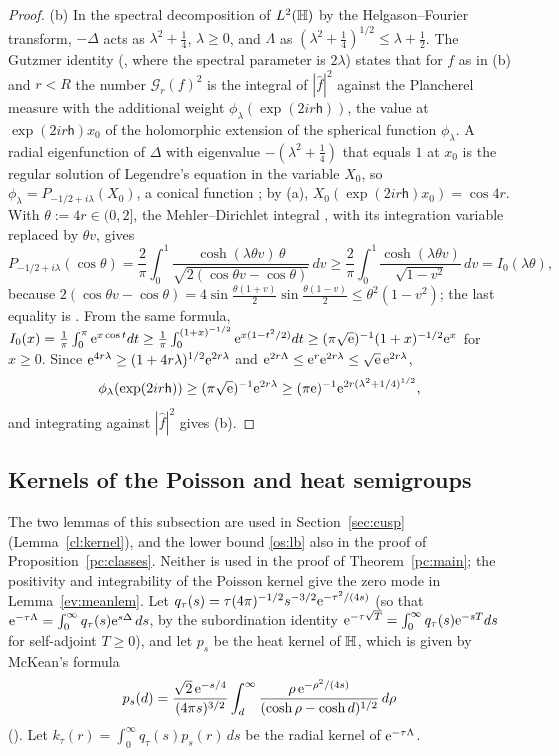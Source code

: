\begin{proof}
(b) In the spectral decomposition of $L^2(\mathbb{H})$ by the Helgason--Fourier transform, $-\Delta$ acts as $\lambda^2+\tfrac14$, $\lambda\ge0$, and
$\Lambda$ as $(\lambda^2+\tfrac14)^{1/2}\le\lambda+\tfrac12$. The Gutzmer identity (\cite[\S7.2, the identity before Theorem~7.2]{K}, where the
spectral parameter is $2\lambda$) states that for $f$ as in (b) and $r<R$ the number $\mathcal G_r(f)^2$ is the integral of $|\hat f|^2$ against the
Plancherel measure with the additional weight $\phi_\lambda(\exp(2ir\mathsf h))$, the value at $\exp(2ir\mathsf h)x_0$ of the holomorphic extension of the
spherical function $\phi_\lambda$. A radial eigenfunction of $\Delta$ with eigenvalue $-(\lambda^2+\tfrac14)$ that equals $1$ at $x_0$ is the regular
solution of Legendre's equation in the variable $X_0$, so $\phi_\lambda=P_{-1/2+i\lambda}(X_0)$, a conical function \cite[\S14.20]{DLMF}; by (a),
$X_0(\exp(2ir\mathsf h)x_0)=\cos4r$. With $\theta:=4r\in(0,2]$, the Mehler--Dirichlet integral \cite[14.20.9]{DLMF}, with its integration variable replaced by $\theta v$, gives
\[
P_{-1/2+i\lambda}(\cos\theta)=\frac2\pi\int_0^1\frac{\cosh(\lambda\theta v)\,\theta}{\sqrt{2(\cos\theta v-\cos\theta)}}\,dv
\ge\frac2\pi\int_0^1\frac{\cosh(\lambda\theta v)}{\sqrt{1-v^2}}\,dv=I_0(\lambda\theta),
\]
because $2(\cos\theta v-\cos\theta)=4\sin\tfrac{\theta(1+v)}2\sin\tfrac{\theta(1-v)}2\le\theta^2(1-v^2)$; the last equality is
\cite[10.32.1]{DLMF}. From the same formula, $I_0(x)=\tfrac1\pi\int_0^\pi\mathrm{e}^{x\cos t}dt\ge\tfrac1\pi\int_0^{(1+x)^{-1/2}}\mathrm{e}^{x(1-t^2/2)}dt
\ge(\pi\sqrt{\mathrm{e}})^{-1}(1+x)^{-1/2}\mathrm{e}^{x}$ for $x\ge0$. Since $\mathrm{e}^{4r\lambda}\ge(1+4r\lambda)^{1/2}\mathrm{e}^{2r\lambda}$ and
$\mathrm{e}^{2r\Lambda}\le\mathrm{e}^{r}\mathrm{e}^{2r\lambda}\le\sqrt{\mathrm{e}}\,\mathrm{e}^{2r\lambda}$,
\[
\phi_\lambda(\exp(2ir\mathsf h))\ge(\pi\sqrt{\mathrm{e}})^{-1}\mathrm{e}^{2r\lambda}\ge(\pi\mathrm{e})^{-1}\mathrm{e}^{2r(\lambda^2+1/4)^{1/2}} ,
\]
and integrating against $|\hat f|^2$ gives (b).
\end{proof}

\subsection{Kernels of the Poisson and heat semigroups}\label{app:kernels}

The two lemmas of this subsection are used in Section~\ref{sec:cusp} (Lemma~\ref{cl:kernel}), and the lower bound \eqref{os:lb}
also in the proof of Proposition~\ref{pc:classes}. Neither is used in the proof of Theorem~\ref{pc:main}; the positivity and integrability of the Poisson kernel give the zero mode in Lemma~\ref{ev:meanlem}.
Let $q_\tau(s)=\tau(4\pi)^{-1/2}s^{-3/2}\mathrm{e}^{-\tau^2/(4s)}$ (so that $\mathrm{e}^{-\tau\Lambda}=\int_0^\infty q_\tau(s)\mathrm{e}^{s\Delta}\,ds$, by
the subordination identity $\mathrm{e}^{-\tau\sqrt T}=\int_0^\infty q_\tau(s)\mathrm{e}^{-sT}ds$ for self-adjoint $T\ge0$), and let $p_s$ be the heat kernel of $\mathbb{H}$, which is
given by McKean's formula
\[
p_s(d)=\frac{\sqrt2\,\mathrm{e}^{-s/4}}{(4\pi s)^{3/2}}\int_d^\infty\frac{\rho\,\mathrm{e}^{-\rho^2/(4s)}}{(\cosh\rho-\cosh d)^{1/2}}\,d\rho
\]
(\cite[(1.7)]{GN98}). Let
$k_\tau(r)=\int_0^\infty q_\tau(s)p_s(r)\,ds$ be the radial kernel of $\mathrm{e}^{-\tau\Lambda}$.

